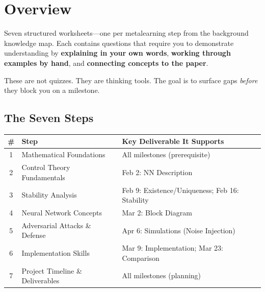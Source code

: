 \section*{Overview}

\begin{purposebox}
	Seven structured worksheets---one per metalearning step from the background knowledge map.
	Each contains questions that require you to demonstrate understanding by \textbf{explaining in your own words},
	\textbf{working through examples by hand}, and \textbf{connecting concepts to the paper}.

	These are not quizzes. They are thinking tools. The goal is to surface gaps \emph{before} they block you on a milestone.
\end{purposebox}

\subsection*{The Seven Steps}

\begin{table}[h]
	\centering
	\renewcommand{\arraystretch}{1.3}
	\begin{tabularx}{\textwidth}{c l X}
		\toprule
		\textbf{\#} & \textbf{Step}                    & \textbf{Key Deliverable It Supports}           \\
		\midrule
		1           & Mathematical Foundations         & All milestones (prerequisite)                  \\
		2           & Control Theory Fundamentals      & Feb 2: NN Description                          \\
		3           & Stability Analysis               & Feb 9: Existence/Uniqueness; Feb 16: Stability \\
		4           & Neural Network Concepts          & Mar 2: Block Diagram                           \\
		5           & Adversarial Attacks \& Defense   & Apr 6: Simulations (Noise Injection)           \\
		6           & Implementation Skills            & Mar 9: Implementation; Mar 23: Comparison      \\
		7           & Project Timeline \& Deliverables & All milestones (planning)                      \\
		\bottomrule
	\end{tabularx}
\end{table}

